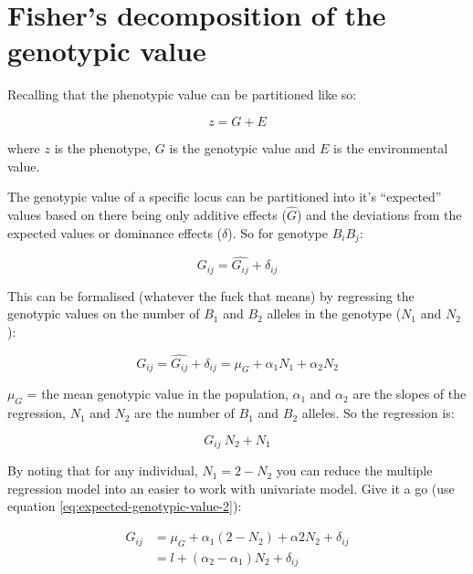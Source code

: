 \documentclass[
]{book}
\begin{document}
\hypertarget{fishers-decomposition-of-the-genotypic-value}{%
\section{Fisher's decomposition of the genotypic value}\label{fishers-decomposition-of-the-genotypic-value}}

Recalling that the phenotypic value can be partitioned like so:

\begin{equation}
  z = G + E
  \label{eq:phenotypic-value-partition}
\end{equation}

where \(z\) is the phenotype, \(G\) is the genotypic value and \(E\) is the environmental value.

The genotypic value of a specific locus can be partitioned into it's ``expected'' values based on there being only additive effects (\(\hat{G}\)) and the deviations from the expected values or dominance effects (\(\delta\)). So for genotype \(B_iB_j\):

\begin{equation}
  G_{ij} = \hat{G_{ij}} + \delta_{ij}
  \label{eq:expected-genotypic-value-simple}
\end{equation}

This can be formalised (whatever the fuck that means) by regressing the genotypic values on the number of \(B_1\) and \(B_2\) alleles in the genotype (\(N_1\) and \(N_2\)):

\begin{equation}
  G_{ij} = \hat{G_{ij}} + \delta_{ij} = \mu_G + \alpha_1N_1 + \alpha_2N_2
  \label{eq:expected-genotypic-value-2}
\end{equation}

\(\mu_G\) = the mean genotypic value in the population, \(\alpha_1\) and \(\alpha_2\) are the slopes of the regression, \(N_1\) and \(N_2\) are the number of \(B_1\) and \(B_2\) alleles. So the regression is:

\begin{equation}
  G_{ij} ~ N_2 + N_1
\end{equation}

By noting that for any individual, \(N_1 = 2 - N_2\) you can reduce the multiple regression model into an easier to work with univariate model. Give it a go (use equation \eqref{eq:expected-genotypic-value-2}):

\begin{equation}
\begin{split}
  G_{ij} &= \mu_G + \alpha_1(2 - N_2) + \alpha2N_2 + \delta_{ij} \\
  &= l + (\alpha_2 - \alpha_1)N_2 + \delta_{ij}
\end{split}
\label{eq:genotypic-value-regression}
\end{equation}
\end{document}
